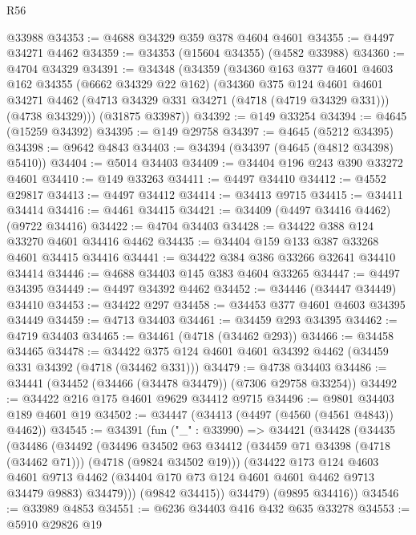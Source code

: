 \begin{lexlean}{R56}
\begin{coremodule}
    @33988
@34353 := @4688 @34329 @359 @378 @4604 @4601
@34355 := @4497 @34271 @4462
@34359 := @34353 (@15604 @34355) (@4582 @33988)
@34360 := @4704 @34329
@34391 := @34348
    (@34359
      (@34360
        @163
        @377
        @4601
        @4603
        @162
        @34355
        (@6662 @34329 @22 @162)
        (@34360
          @375
          @124
          @4601
          @4601
          @34271
          @4462
          (@4713 @34329 @331 @34271 (@4718 (@4719 @34329 @331)))
          (@4738 @34329)))
      (@31875 @33987))
@34392 := @149 @33254
@34394 := @4645 (@15259 @34392)
@34395 := @149 @29758
@34397 := @4645 (@5212 @34395)
@34398 := @9642 @4843
@34403 := @34394 (@34397 (@4645 (@4812 @34398) @5410))
@34404 := @5014 @34403
@34409 := @34404 @196 @243 @390 @33272 @4601
@34410 := @149 @33263
@34411 := @4497 @34410
@34412 := @4552 @29817
@34413 := @4497 @34412
@34414 := @34413 @9715
@34415 := @34411 @34414
@34416 := @4461 @34415
@34421 := @34409 (@4497 @34416 @4462) (@9722 @34416)
@34422 := @4704 @34403
@34428 := @34422 @388 @124 @33270 @4601 @34416 @4462
@34435 := @34404 @159 @133 @387 @33268 @4601 @34415 @34416
@34441 := @34422 @384 @386 @33266 @32641 @34410 @34414
@34446 := @4688 @34403 @145 @383 @4604 @33265
@34447 := @4497 @34395
@34449 := @4497 @34392 @4462
@34452 := @34446 (@34447 @34449) @34410
@34453 := @34422 @297
@34458 := @34453 @377 @4601 @4603 @34395 @34449
@34459 := @4713 @34403
@34461 := @34459 @293 @34395
@34462 := @4719 @34403
@34465 := @34461 (@4718 (@34462 @293))
@34466 := @34458 @34465
@34478 := @34422 @375 @124 @4601 @4601 @34392 @4462 (@34459 @331 @34392 (@4718 (@34462 @331)))
@34479 := @4738 @34403
@34486 := @34441 (@34452 (@34466 (@34478 @34479)) (@7306 @29758 @33254))
@34492 := @34422 @216 @175 @4601 @9629 @34412 @9715
@34496 := @9801 @34403 @189 @4601 @19
@34502 := @34447 (@34413 (@4497 (@4560 (@4561 @4843)) @4462))
@34545 := @34391
    (fun ("_" : @33990) =>
    @34421
      (@34428
        (@34435
          (@34486
            (@34492
              (@34496
                @34502
                @63
                @34412
                (@34459 @71 @34398 (@4718 (@34462 @71)))
                (@4718 (@9824 @34502 @19)))
              (@34422
                @173
                @124
                @4603
                @4601
                @9713
                @4462
                (@34404 @170 @73 @124 @4601 @4601 @4462 @9713 @34479 @9883)
                @34479)))
          (@9842 @34415))
        @34479)
      (@9895 @34416))
@34546 := @33989 @4853
@34551 := @6236 @34403 @416 @432 @635 @33278
@34553 := @5910 @29826 @19

\end{coremodule}
\end{lexlean}
